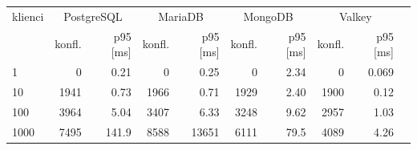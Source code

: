 \begin{tabular}{lrrrrrrrrr}
\toprule
klienci & \multicolumn{2}{c}{PostgreSQL} & \multicolumn{2}{c}{MariaDB} & \multicolumn{2}{c}{MongoDB} & \multicolumn{2}{c}{Valkey} \\
 & konfl. & p95 [ms] & konfl. & p95 [ms] & konfl. & p95 [ms] & konfl. & p95 [ms] \\
\midrule
1 & \num{0} & \num{0.21} & \num{0} & \num{0.25} & \num{0} & \num{2.34} & \num{0} & \num{0.069} \\
10 & \num{1941} & \num{0.73} & \num{1966} & \num{0.71} & \num{1929} & \num{2.40} & \num{1900} & \num{0.12} \\
100 & \num{3964} & \num{5.04} & \num{3407} & \num{6.33} & \num{3248} & \num{9.62} & \num{2957} & \num{1.03} \\
1000 & \num{7495} & \num{141.9} & \num{8588} & \num{13651} & \num{6111} & \num{79.5} & \num{4089} & \num{4.26} \\
\bottomrule
\end{tabular}
